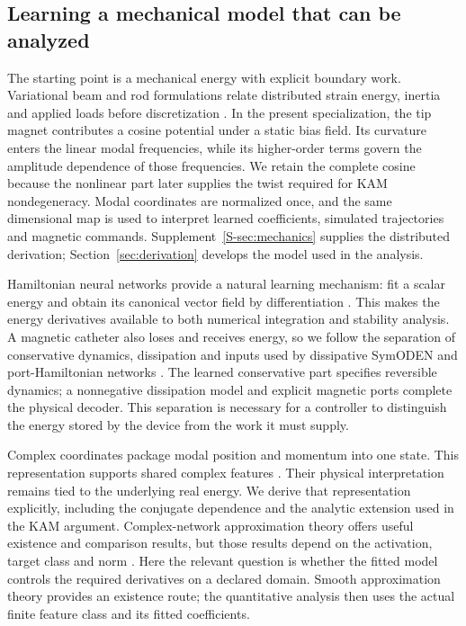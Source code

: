 \subsection{Learning a mechanical model that can be analyzed}
The starting point is a mechanical energy with explicit boundary work. Variational beam and rod formulations relate distributed strain energy, inertia and applied loads before discretization \citep{simo,antman}. In the present specialization, the tip magnet contributes a cosine potential under a static bias field. Its curvature enters the linear modal frequencies, while its higher-order terms govern the amplitude dependence of those frequencies. We retain the complete cosine because the nonlinear part later supplies the twist required for KAM nondegeneracy. Modal coordinates are normalized once, and the same dimensional map is used to interpret learned coefficients, simulated trajectories and magnetic commands. Supplement~\ref{S-sec:mechanics} supplies the distributed derivation; Section~\ref{sec:derivation} develops the model used in the analysis.

Hamiltonian neural networks provide a natural learning mechanism: fit a scalar energy and obtain its canonical vector field by differentiation \citep{greydanus}. This makes the energy derivatives available to both numerical integration and stability analysis. A magnetic catheter also loses and receives energy, so we follow the separation of conservative dynamics, dissipation and inputs used by dissipative SymODEN and port-Hamiltonian networks \citep{zhong,desai}. The learned conservative part specifies reversible dynamics; a nonnegative dissipation model and explicit magnetic ports complete the physical decoder. This separation is necessary for a controller to distinguish the energy stored by the device from the work it must supply.

Complex coordinates package modal position and momentum into one state. This representation supports shared complex features \citep{trabelsi}. Their physical interpretation remains tied to the underlying real energy. We derive that representation explicitly, including the conjugate dependence and the analytic extension used in the KAM argument. Complex-network approximation theory offers useful existence and comparison results, but those results depend on the activation, target class and norm \citep{zhang}. Here the relevant question is whether the fitted model controls the required derivatives on a declared domain. Smooth approximation theory \citep{hornik} provides an existence route; the quantitative analysis then uses the actual finite feature class and its fitted coefficients.

